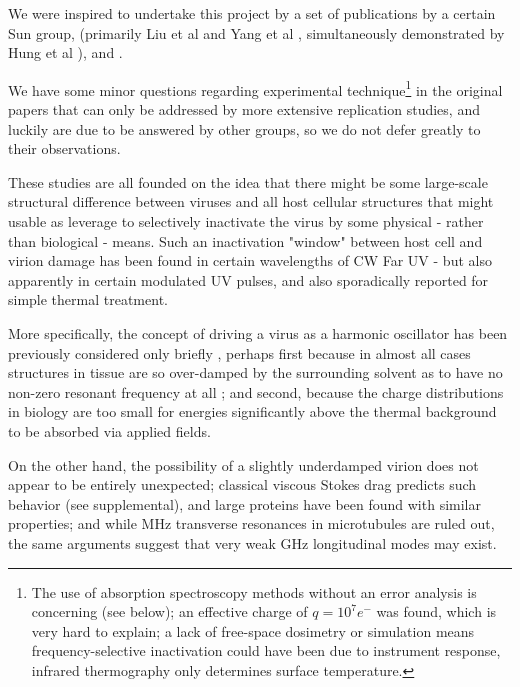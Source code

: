 \documentclass[paper.tex]{subfiles}
\begin{document}

We were inspired to undertake this project by a set of publications by a certain Sun group, (primarily Liu et al \cite{Microwave2009} and Yang et al \cite{Efficient2015}, simultaneously demonstrated by Hung et al \cite{focusing2014}), and \cite{Optical2020} \cite{Theoretical2020}.

We have some minor questions regarding experimental technique\footnote{The use of absorption spectroscopy methods without an error analysis is concerning (see below); an effective charge of $q=10^7 e^-$ was found, which is very hard to explain; a lack of free-space dosimetry or simulation means frequency-selective inactivation could have been due to instrument response, infrared thermography only determines surface temperature.} in the original papers that can only be addressed by more extensive replication studies, and luckily are due to be answered by other groups\cite{Generating}, so we do not defer greatly to their observations. 

These studies are all founded on the idea that there might be some large-scale structural difference between viruses and all host cellular structures that might usable as leverage to selectively inactivate the virus by some physical - rather than biological - means. Such an inactivation "window" between host cell and virion damage has been found in certain wavelengths of CW Far UV\cite{Germicidal2017} - but also apparently in certain modulated UV pulses\cite{Use1987a}\cite{Can1993}, and also sporadically reported for simple thermal treatment\cite{Summary}. 

More specifically, the concept of driving a virus as a harmonic oscillator has been previously considered only briefly \cite{MECHANICAL1968}\cite{Comment2004}, perhaps first because in almost all cases structures in tissue are so over-damped by the surrounding solvent\cite{Vibrational2002}\cite{Biological2002}\cite{Biophysics2000}\cite{Viscous2000} as to have no non-zero resonant frequency at all \cite{dielectric1996}\cite{gabriel1996compilation}; and second, because the charge distributions in biology are too small for energies significantly above the thermal background to be absorbed via applied fields. 

On the other hand, the possibility of a slightly underdamped virion does not appear to be entirely unexpected; classical viscous Stokes drag predicts such behavior\cite{nature1986} (see supplemental), and large proteins have been found with similar properties\cite{Microwave1994}; and while MHz transverse resonances in microtubules are ruled out\cite{Viscous2000}, the same arguments suggest that very weak GHz longitudinal modes may exist. 
\end{document}

